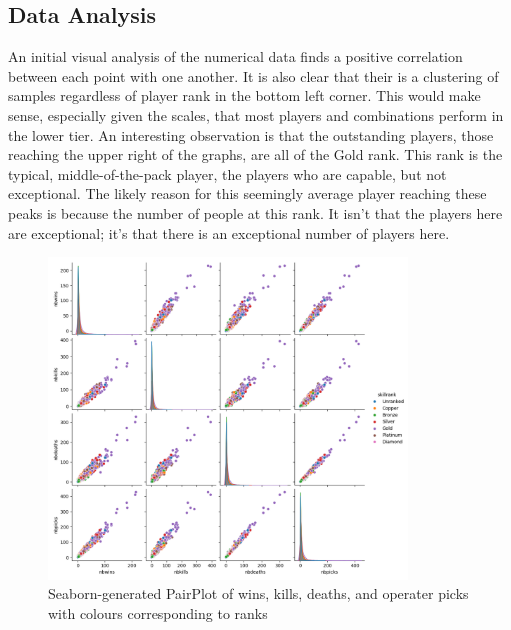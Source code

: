 \documentclass[12pt]{article}
\begin{document}
\subsection{Data Analysis}
An initial visual analysis of the numerical data finds a positive correlation between each point with one another.
It is also clear that their is a clustering of samples regardless of player rank in the bottom left corner.
This would make sense, especially given the scales, that most players and combinations perform in the lower tier.
An interesting observation is that the outstanding players, those reaching the upper right of the graphs, are all of the Gold rank.
This rank is the typical, middle-of-the-pack player, the players who are capable, but not exceptional.
The likely reason for this seemingly average player reaching these peaks is because the number of people at this rank.
It isn't that the players here are exceptional; it's that there is an exceptional number of players here.
\begin{figure}[H]
	\centering
	\includegraphics[width=0.85\textwidth]{wins-kills-deaths-picks-pairplot}
	\caption{Seaborn-generated PairPlot of wins, kills, deaths, and operater picks with colours corresponding to ranks}
	\label{fig:pairplot}
\end{figure}
\end{document}
